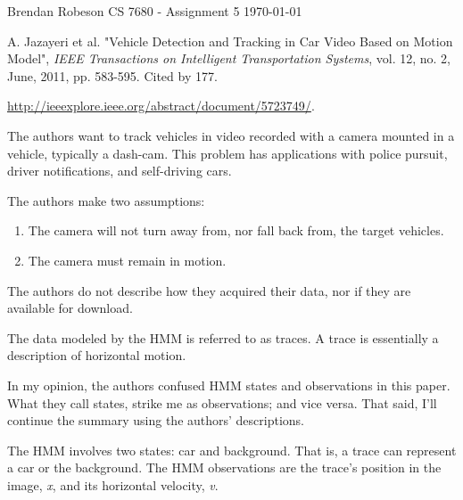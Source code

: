\documentclass[11pt]{article}
\begin{document}
\noindent Brendan Robeson \hfill CS 7680 - Assignment 5 \hfill \today
%
%

\medskip

\begin{description}[leftmargin=0in]
    \item [Source] A. Jazayeri et al. "Vehicle Detection and Tracking in Car Video Based on Motion
        Model", \emph{IEEE Transactions on Intelligent Transportation Systems}, vol. 12, no. 2,
        June, 2011, pp. 583-595. Cited by 177.

    \item [URL]
        \url{http://ieeexplore.ieee.org/abstract/document/5723749/}.

    \item [Problem] The authors want to track vehicles in video recorded with a camera mounted in a
        vehicle, typically a dash-cam. This problem has applications with police pursuit, driver
        notifications, and self-driving cars.

    \item [Assumptions] The authors make two assumptions:
        \begin{enumerate}
            \item The camera will not turn away from, nor fall back from, the target vehicles.
            \item The camera must remain in motion.
        \end{enumerate}

    \item [Data Sets] The authors do not describe how they acquired their data, nor if they are
        available for download.

    \item [Algorithm Overview]
        The data modeled by the HMM is referred to as traces. A trace is essentially a description
        of horizontal motion.

        In my opinion, the authors confused HMM states and observations in this paper. What they
        call states, strike me as observations; and vice versa. That said, I'll continue the summary
        using the authors' descriptions.

        The HMM involves two states: car and background. That is, a trace can represent a car or the
        background. The HMM observations are the trace's position in the image, \emph{x}, and its
        horizontal velocity, \emph{v}.


\end{description}
\end{document}

